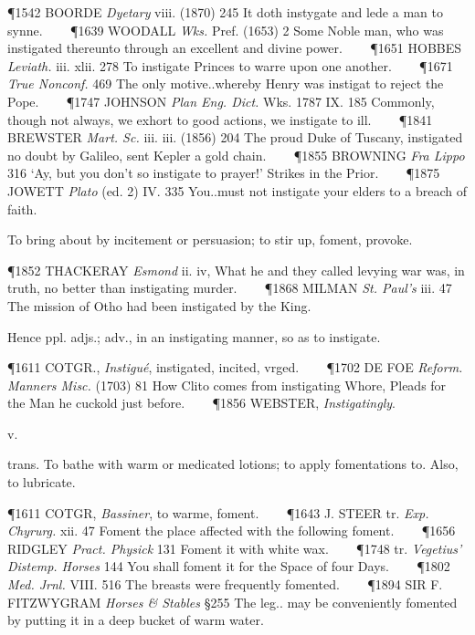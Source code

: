 \begin{description}[wide, labelwidth=!, labelindent=0pt]
\begin{myenumerate}
\P 1542 BOORDE  \textit{Dyetary} viii. (1870) 245 It doth instygate and lede a man to synne.    
\P 1639 WOODALL  \textit{Wks.} Pref. (1653) 2 Some Noble man, who was instigated thereunto through an excellent and divine power.    
\P 1651 HOBBES  \textit{Leviath.} iii. xlii. 278 To instigate Princes to warre upon one another.    
\P 1671  \textit{True Nonconf.} 469 The only motive..whereby Henry was instigat to reject the Pope.    
\P 1747 JOHNSON  \textit{Plan Eng. Dict.} Wks. 1787 IX. 185  Commonly, though not always, we exhort to good actions, we instigate to ill.    
\P 1841 BREWSTER  \textit{Mart. Sc.} iii. iii. (1856) 204 The proud Duke of Tuscany, instigated no doubt by Galileo, sent Kepler a gold chain.    
\P 1855 BROWNING  \textit{Fra Lippo} 316 ‘Ay, but you don't so instigate to prayer!’ Strikes in the Prior.    
\P 1875 JOWETT  \textit{Plato} (ed. 2) IV. 335 You..must not instigate your elders to a breach of faith.

 To bring about by incitement or persuasion; to stir up, foment, provoke.

\P 1852 THACKERAY  \textit{Esmond} ii. iv, What he and they called levying war was, in truth, no better than instigating murder.    
\P 1868 MILMAN  \textit{St. Paul's} iii. 47 The mission of Otho had been instigated by the King.

Hence  ppl. adjs.;  adv., in an instigating manner, so as to instigate.

\P 1611 COTGR.,  \textit{Instigué}, instigated, incited, vrged.    
\P 1702 DE FOE  \textit{Reform. Manners Misc.} (1703) 81 How Clito comes from instigating Whore, Pleads for the Man he cuckold just before.    
\P 1856 WEBSTER, \textit{Instigatingly}.
\end{myenumerate}


 v.

\noindent {}

\vspace{-0.3cm}

\begin{myenumerate}

 trans. To bathe with warm or medicated lotions; to apply fomentations to. Also, to lubricate.

\P 1611 COTGR,  \textit{Bassiner}, to warme, foment.    
\P 1643 J. STEER  tr. \textit{Exp. Chyrurg.} xii. 47 Foment the place affected with the following foment.    
\P 1656 RIDGLEY  \textit{Pract. Physick} 131 Foment it with white wax.    
\P 1748 tr.  \textit{Vegetius' Distemp. Horses} 144 You shall foment it for the Space of four Days.    
\P 1802  \textit{Med. Jrnl.} VIII. 516 The breasts were frequently fomented.    
\P 1894 SIR F. FITZWYGRAM  \textit{Horses \& Stables} §255 The leg.. may be conveniently fomented by putting it in a deep bucket of warm water.


\end{myenumerate}
\end{description}
